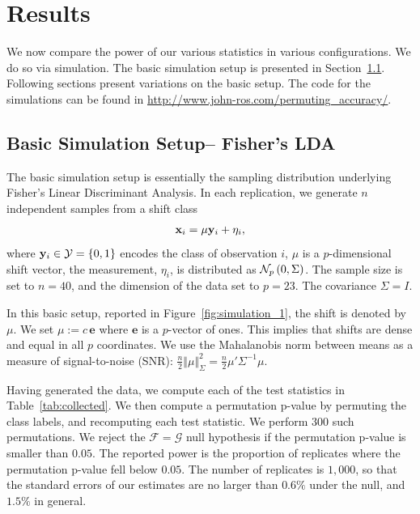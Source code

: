 \documentclass[]{bio}
\begin{document}
\section{Results}
\label{sec:results}
We now compare the power of our various statistics in various configurations. 
We do so via simulation.
The basic simulation setup is presented in Section~\ref{sec:simulation_details}.
Following sections present variations on the basic setup.
The \R code for the simulations can be found in \url{http://www.john-ros.com/permuting_accuracy/}.


\subsection{Basic Simulation Setup-- Fisher's LDA}
\label{sec:simulation_details}

The basic simulation setup is essentially the sampling distribution underlying Fisher's Linear Discriminant Analysis. 
In each replication, we generate $n$ independent samples from a shift class 
\begin{align}
\label{eq:distribution}
\mathbf{x}_i = \mu \mathbf{y}_i + \eta_i,
\end{align}
where $\mathbf{y}_i \in \mathcal{Y}=\{ 0,1 \}$ encodes the class of observation $i$, $\mu$ is a $p$-dimensional shift vector, the measurement, $\eta_i$, is distributed as $\mathcal{N}_{p}\left(0,\Sigma\right)$.
The sample size is set to $n=40$, and the dimension of the data set to $p=23$. 
The covariance $\Sigma=I$. 

In this basic setup, reported in Figure~\ref{fig:simulation_1}, the shift is denoted by $\mu$. 
We set $\mu:=c \, \textbf{e}$ where $\textbf{e}$ is a $p$-vector of ones. 
This implies that shifts are dense and equal in all $p$ coordinates.
We use the Mahalanobis norm between means as a measure of signal-to-noise (SNR): 
$\frac{n}{2}\Vert \mu \Vert_\Sigma^2=\frac{n}{2} \mu' \Sigma^{-1} \mu$.

Having generated the data, we compute each of the test statistics in Table~\ref{tab:collected}.
We then compute a permutation p-value by permuting the class labels, and recomputing each test statistic. 
We perform $300$ such permutations. 
We reject the $\mathcal{F}=\mathcal{G}$ null hypothesis if the permutation p-value is smaller than $0.05$.
The reported power is the proportion of replicates where the permutation p-value fell below $0.05$.
The number of replicates is $1,000$, so that the standard errors of our estimates are no larger than $0.6\%$ under the null, and $1.5\%$ in general. 
\end{document}
